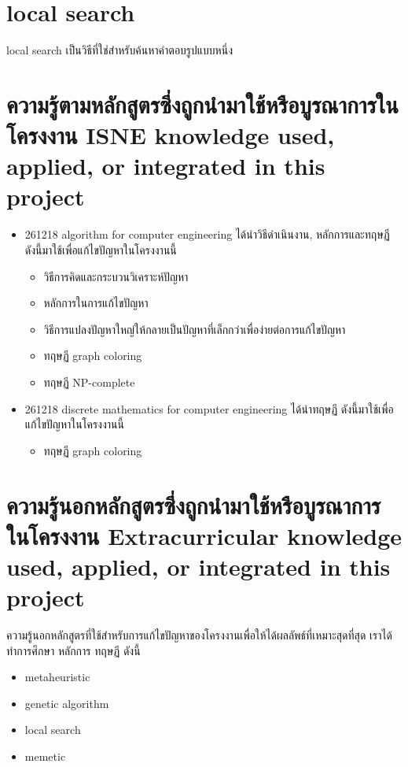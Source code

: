 \section{local search}
local search เป็นวิธีที่ใช่สำหรับค้นหาคำตอบรูปแบบหนึ่ง 


\section{\ifcpe%
ความรู้ตามหลักสูตรซึ่งถูกนำมาใช้หรือบูรณาการในโครงงาน
\else%
ISNE knowledge used, applied, or integrated in this project
\fi
}
\begin{itemize}
  \item 261218 algorithm for computer engineering ได้นำวิธีดำเนินงาน, หลักการและทฤษฏี ดังนี้มาใช้เพื่อแก้ไขปัญหาในโครงงานนี้  
  \begin{itemize}
  \item วิธีการคิดและกระบวนวิเคราะห์ปัญหา
  \item หลักการในการแก้ไขปัญหา
  \item วิธีการแปลงปัญหาใหญ่ให้กลายเป็นปัญหาที่เล็กกว่าเพื่อง่ายต่อการแก้ไขปัญหา
  \item ทฤษฏี graph coloring
  \item ทฤษฏี NP-complete
  \end{itemize}

\item 261218 discrete mathematics for computer engineering  ได้นำทฤษฏี ดังนี้มาใช้เพื่อแก้ไขปัญหาในโครงงานนี้
  \begin{itemize}
  \item ทฤษฏี graph coloring
  \end{itemize}
\end{itemize}

\section{\ifcpe%
ความรู้นอกหลักสูตรซึ่งถูกนำมาใช้หรือบูรณาการในโครงงาน
\else%
Extracurricular knowledge used, applied, or integrated in this project
\fi
}
ความรู้นอกหลักสูตรที่ใช้สำหรับการแก้ไขปัญหาของโครงงานเพื่อให้ได้ผลลัพธ์ที่เหมาะสุดที่สุด เราได้ทำการศึกษา หลักการ ทฤษฏี ดังนี้
\begin{itemize}
  \item meta­heuristic 
  \item genetic algorithm
  \item local search
  \item memetic 
\end{itemize}

